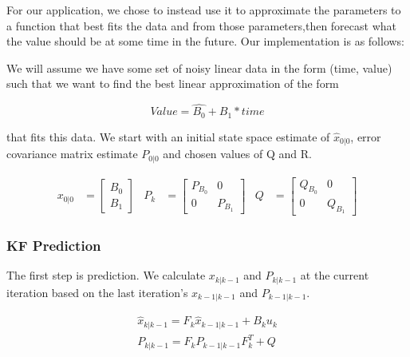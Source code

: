  For our application, we chose to instead use it to approximate the parameters to a function that best fits the data and from those parameters,then forecast what the value should be at some time in the future. Our implementation is as follows:

We will assume we have some set of noisy linear data in the form (time, value) such that we want to find the best linear approximation of the form 

\begin{equation} 
Value = \hat{B_{0}} + \hat{B_{1}}*time  
\end{equation}

that fits this data. We start with an initial state space estimate of $\hat{x}_{0|0}$, error covariance matrix estimate $P_{0|0}$ and chosen values of Q and R.

\begin{subequations}
\begin{align}
    x_{0|0} &= \begin{bmatrix}
           B_{0} \\
           B_{1}
         \end{bmatrix}
 \end{align}
  \begin{align}
    P_{k} &= \begin{bmatrix}
           P_{B_{0}}&0 \\
           0&P_{B_{1}}
         \end{bmatrix}
  \end{align}
  \begin{align}
    Q &= \begin{bmatrix}
        Q_{B_{0}}&0 \\
        0&Q_{B_{1}}
        \end{bmatrix}
  \end{align}
  \end{subequations}
  
  \subsubsection{KF Prediction}
  
  The first step is prediction. We calculate $x_{k|k-1}$ and $P_{k|k-1}$ at the current iteration based on the last iteration's $x_{k-1|k-1}$ and $P_{k-1|k-1}$.
  
  \begin{subequations}
  \begin{align}
  \hat{x}_{k|k-1} = F_{k} \hat{x}_{k-1|k-1}+B_{k}u_{k}   \\
  P_{k|k-1} = F_{k} P_{k-1|k-1}F_{k}^{T}+Q
  \end{align}
  \end{subequations}
  
